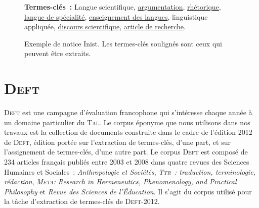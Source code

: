 \begin{figure}[!h]
{{          \textbf{Termes-clés~:} Langue scientifique, \underline{argumentation},
          \underline{rhétorique}, \underline{langue de spécialité},
          \underline{enseignement des langues}, linguistique appliquée,
          \underline{discours scientifique}, \underline{article de recherche}. 
        }
      }
%
%
      \caption[Exemple de notice Inist]{
        Exemple de notice Inist. Les termes-clés soulignés sont ceux qui peuvent
        être extraits. 
        \label{fig:example_inist}
      }
    \end{figure}


  \section[\textsc{Deft}]{\textsc{Deft}~\textnormal{\large\cite{paroubek2012deft}}}
  \label{sec:main-data_description-deft_data}
    \textsc{Deft} est une campagne d'évaluation francophone qui s'intéresse
    chaque année à un domaine particulier du \textsc{Tal}. Le corpus éponyme que
    nous utilisons dans nos travaux est la collection de documents construite
    dans le cadre de l'édition 2012 de \textsc{Deft}, édition portée sur
    l'extraction de termes-clés, d'une part, et sur l'assignement de
    termes-clés, d'une autre part. Le corpus \textsc{Deft} est composé de 234
    articles français publiés entre 2003 et 2008 dans quatre revues des Sciences
    Humaines et Sociales~: \textit{Anthropologie et Sociétés},
    \textit{\textsc{Ttr}~: traduction, terminologie, rédaction},
    \textit{\textsc{Meta}: Research in Hermeneutics, Phenomenology, and
    Practical Philosophy} et \textit{Revue des Sciences de l'Éducation}. Il
    s'agit du corpus utilisé pour la tâche d'extraction de termes-clés de
    \textsc{Deft}-2012.
    
